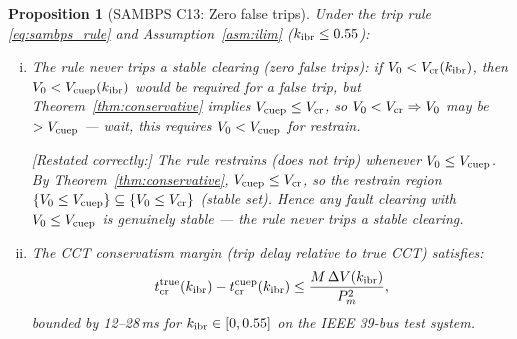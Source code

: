 \documentclass[journal]{IEEEtran}
\newtheorem{proposition}{Proposition}
\newcommand{\kibr}{k_{\rm ibr}}
\newcommand{\Vcuep}{V_{\rm cuep}}
\newcommand{\Vcr}{V_{\rm cr}}
\newcommand{\Vnaught}{V_0}
\newcommand{\DeltaV}{\Delta V}
\newcommand{\Pm}{P_m}
\newcommand{\CCT}{t_{\rm cr}}
\begin{document}
\begin{proposition}[SAMBPS C13: Zero false trips]
\label{prop:sambps}
Under the trip rule \eqref{eq:sambps_rule} and
Assumption~\ref{asm:ilim} ($\kibr \leq 0.55$):
\begin{enumerate}[(i)]
  \item The rule never trips a stable clearing (zero false trips):
        if $\Vnaught < \Vcr(\kibr)$, then $\Vnaught < \Vcuep(\kibr)$
        would be required for a false trip, but Theorem~\ref{thm:conservative}
        implies $\Vcuep \leq \Vcr$, so
        $\Vnaught < \Vcr \Rightarrow \Vnaught$ may be $> \Vcuep$
        --- wait, this requires $\Vnaught < \Vcuep$ for restrain.

\textit{[Restated correctly:]}
The rule \emph{restrains} (does not trip) whenever $\Vnaught \leq \Vcuep$.
By Theorem~\ref{thm:conservative}, $\Vcuep \leq \Vcr$, so the restrain
region $\{\Vnaught \leq \Vcuep\} \subseteq \{\Vnaught \leq \Vcr\}$
(stable set).  Hence any fault clearing with $\Vnaught \leq \Vcuep$
is genuinely stable --- the rule never trips a stable clearing.

  \item The CCT conservatism margin (trip delay relative to true CCT)
        satisfies:
        \begin{equation}
          \CCT^{\rm true}(\kibr) - \CCT^{\rm cuep}(\kibr)
          \leq \frac{M\,\DeltaV(\kibr)}{\Pm^2},
          \label{eq:cct_margin}
        \end{equation}
        bounded by 12--28\,ms for $\kibr \in [0, 0.55]$ on the
        IEEE 39-bus test system.
\end{enumerate}
\end{proposition}
\end{document}
